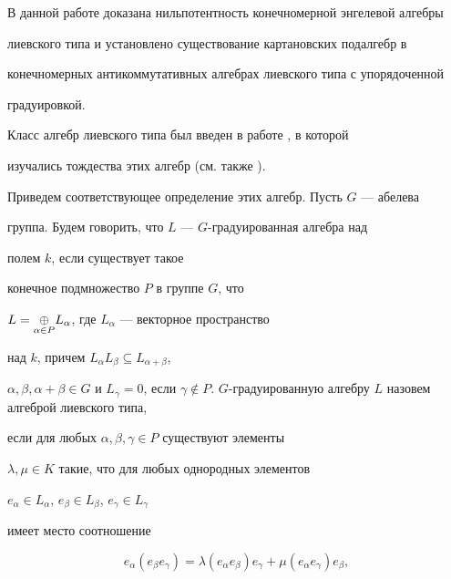 

\maketitle


\label{begin}


 


 


В данной работе доказана нильпотентность конечномерной энгелевой алгебры 


лиевского типа и установлено существование картановских подалгебр в 


конечномерных антикоммутативных алгебрах лиевского типа с упорядоченной 


градуировкой. 


 


Класс алгебр лиевского типа был введен в работе \cite{1}, в которой 


изучались тождества этих алгебр (см. также \cite{2}). 


 


Приведем соответствующее определение этих алгебр. Пусть $G$ --- абелева 


группа. Будем говорить, что $L$ --- $G$-градуированная алгебра над 


полем $k$, если существует такое


конечное подмножество $P$ в группе $G$, что 


$L=\underset{\alpha\in P}{\oplus}{} L_\alpha$, где $L_\alpha$ --- векторное пространство 


над $k$, причем $L_\alpha L_\beta\subseteq L_{\alpha+\beta}$, 


$\alpha,\beta,\alpha+\beta\in G$ и $L_\gamma=0$, если $\gamma\notin 


P$.\; $G$-градуированную алгебру $L$ назовем алгеброй лиевского типа, 


если для любых $\alpha,\beta,\gamma\in P$ существуют элементы 


$\lambda,\mu\in K$ такие, что для любых однородных элементов 


$e_\alpha\in L_\alpha$, $e_\beta\in L_\beta$, $e_\gamma\in L_\gamma$ 


имеет место соотношение 


\begin{equation} 


e_\alpha(e_\beta e_\gamma)=\lambda(e_\alpha e_\beta) 


e_\gamma+\mu(e_\alpha e_\gamma)e_\beta,  


\end{equation} 


